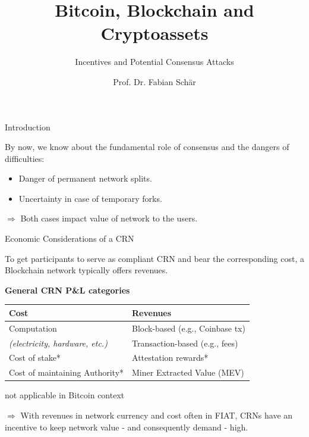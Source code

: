 \documentclass[]{beamer}
\title{Bitcoin, Blockchain and Cryptoassets}
\subtitle{Incentives and Potential Consensus Attacks}
\author{Prof. Dr. Fabian Schär}
\institute{University of Basel}
\begin{document}
\thispagestyle{empty}
\begin{frame}[noframenumbering]
	\titlepage
\end{frame}

\begin{frame}{Introduction}

By now, we know about the fundamental role of consensus and the dangers of difficulties:
	\begin{itemize}
		\item Danger of permanent network splits.
		\item Uncertainty in case of temporary forks.
	\end{itemize}
	
\vspace{0.5 em}
$\Rightarrow$ Both cases impact value of network to the users.

\vspace{1.5 em}

\end{frame}

\begin{frame}{Economic Considerations of a CRN}

To get participants to serve as compliant CRN and bear the corresponding cost, a Blockchain network typically offers revenues.

\vspace{1 em}

\footnotesize
\textbf{General CRN P\&L categories}
\begin{table}
	{\renewcommand{\arraystretch}{1.3}%
  \center
  \begin{tabular}[]{p{} | p{}}
		\textbf{Cost} & \textbf{Revenues}      \\
		\hline
		Computation & Block-based (e.g., Coinbase tx)\\
		\textit{(electricity, hardware, etc.)} & Transaction-based (e.g., fees)\\
		Cost of stake* & Attestation rewards*\\
		Cost of maintaining Authority* & Miner Extracted Value (MEV)
  \end{tabular}}
\end{table}

\scriptsize *not applicable in Bitcoin context

\vspace{1 em}
\normalsize
$\Rightarrow$ With revenues in network currency and cost often in FIAT, CRNs have an incentive to keep network value - and consequently demand - high.
	
\end{frame}
\end{document}
